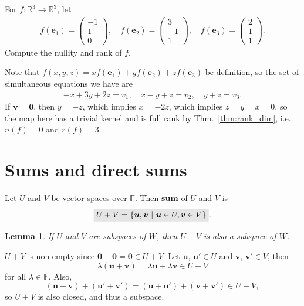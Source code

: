 \documentclass[letter-paper]{tufte-book}
\newtheorem{lemma}[theorem]{\color{pastel-blue}Lemma}
\newenvironment{proof}[1][Proof]{\begin{trivlist}
\item[\hskip \labelsep {\bfseries #1}]}{\end{trivlist}}
\newenvironment{example}[1][Example]{\begin{trivlist}
\item[\hskip \labelsep {\bfseries #1}]}{\end{trivlist}}
\newcommand{\Ob}{{\boldsymbol{0}}}
\newcommand{\eb}{{\boldsymbol{e}}}
\newcommand{\ub}{{\boldsymbol{u}}}
\newcommand{\vb}{{\boldsymbol{v}}}
\newcommand{\highlight}[1]{\mathchoice%
  {\colorbox{black!10}{$\displaystyle#1$}}%
  {\colorbox{black!10}{$\textstyle#1$}}%
  {\colorbox{black!10}{$\scriptstyle#1$}}%
  {\colorbox{black!10}{$\scriptscriptstyle#1$}}}%
\begin{document}
\begin{example}
  For $f: \mathbb{R}^3 \to \mathbb{R}^3$, let
  \begin{align*}
    f(\eb_1) = \begin{pmatrix}-1 \\ 1\\ 0\end{pmatrix}, \quad
    f(\eb_2) = \begin{pmatrix}3 \\ -1\\ 1\end{pmatrix}, \quad
    f(\eb_3) = \begin{pmatrix}2 \\ 1\\ 1\end{pmatrix}.
  \end{align*}
  Compute the nullity and rank of $f$.
  
  Note that $f(x,y,z) = x f(\eb_1) + y f(\eb_2) + z f(\eb_3)$ be definition, so the set of simultaneous equations we have are
  \begin{align*}
    -x + 3y + 2z = v_1, \quad x - y + z = v_2, \quad y + z = v_3.
  \end{align*}
  If $\vb = \Ob$, then $y=-z$, which implies $x = -2z$, which implies $z=y=x=0$, so the map here has a trivial kernel and is full rank by Thm.~\ref{thm:rank_dim}, i.e. $n(f) = 0$ and $r(f) = 3$.
\end{example}


\section{Sums and direct sums}

Let $U$ and $V$ be vector spaces over $\mathbb{F}$. Then \textbf{sum} of $U$ and $V$ is
\begin{equation}
  \highlight{U + V = \{\ub, \vb\ |\ \ub \in U, \vb \in V \}}.
\end{equation}

\begin{lemma}
  If $U$ and $V$ are subspaces of $W$, then $U+V$ is also a subspace of $W$.
\end{lemma}

\begin{proof}
  $U+V$ is non-empty since $\Ob + \Ob = \Ob \in U+V$. Let $\ub$, $\ub' \in U$ and $\vb$, $\vb' \in V$, then
  \begin{equation*}
    \lambda(\ub + \vb) = \lambda\ub + \lambda\vb \in U+V
  \end{equation*}
  for all $\lambda \in \mathbb{F}$. Also,
  \begin{equation*}
    (\ub+\vb) + (\ub'+\vb') = (\ub + \ub') + (\vb + \vb') \in U+V,
  \end{equation*}
  so $U+V$ is also closed, and thus a subspace.
\end{proof}
\end{document}
